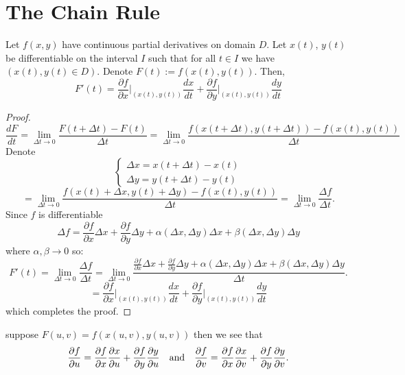 \documentclass[11pt,a4paper]{article}
\begin{document}
  \section{The Chain Rule}
  \begin{proposition}
    Let $f(x,y)$ have continuous partial derivatives on domain $D$.
    Let $x(t)$, $y(t)$ be differentiable on the interval $I$ such that
    for all $t \in I$ we have $(x(t),y(t) \in D)$.
    Denote $F(t) := f(x(t),y(t))$.
    Then,
    \[
      F'(t) = 
      \frac{\partial f}{\partial x}\biggr|_{(x(t),y(t))}\frac{dx}{dt} + 
      \frac{\partial f}{\partial y}\biggr|_{(x(t),y(t))}\frac{dy}{dt}
    \]
  \end{proposition}
  \begin{proof}
    \[
      \frac{dF}{dt} =
      \lim_{\Delta t\to 0}{\frac{F(t+\Delta t)-F(t)}{\Delta t}} =
      \lim_{\Delta t\to 0}
      {\frac{f(x(t+\Delta t),y(t+\Delta t))-f(x(t),y(t))}{\Delta t}} 
    \]
    Denote
    $$\begin{cases}
      \Delta x = x(t+\Delta t) - x(t) \\
      \Delta y = y(t+\Delta t) - y(t) 
    \end{cases}$$
    \[
      = \lim_{\Delta t\to 0}
      {\frac{f(x(t) + \Delta x,y(t)+\Delta y)-f(x(t),y(t))}{\Delta t}} 
      = \lim_{\Delta t\to 0}{\frac{\Delta f}{\Delta t}}.
    \]
    Since $f$ is differentiable
    \[
      \Delta f =
      \frac{\partial f}{\partial x}\Delta x + 
      \frac{\partial f}{\partial y}\Delta y + 
      \alpha(\Delta x,\Delta y)\Delta x + \beta(\Delta x,\Delta y)\Delta y
    \]
    where $\alpha,\beta\to 0 $ so:
    \[
      F'(t) =
      \lim_{\Delta t\to 0}{\frac{\Delta f}{\Delta t}} =
      \lim_{\Delta t\to 0}{\frac{\frac{\partial f}{\partial x}\Delta x + 
      \frac{\partial f}{\partial y}\Delta y +
      \alpha(\Delta x,\Delta y)\Delta x + 
      \beta(\Delta x,\Delta y)\Delta y}{\Delta t}}.
    \]
    \[
      = \frac{\partial f}{\partial x}\biggr|_{(x(t),y(t))}\frac{dx}{dt} + 
        \frac{\partial f}{\partial y}\biggr|_{(x(t),y(t))}\frac{dy}{dt}
    \]
    which completes the proof.
  \end{proof}

  \begin{corollary}
    suppose $F(u,v) = f(x(u,v),y(u,v))$ then we see that
    \[
      \frac{\partial f}{\partial u} =
      \frac{\partial f}{\partial x}
      \frac{\partial x}{\partial u} +
      \frac{\partial f}{\partial y}
      \frac{\partial y}{\partial u}
    \quad \text{and} \quad
      \frac{\partial f}{\partial v} =
      \frac{\partial f}{\partial x}
      \frac{\partial x}{\partial v} +
      \frac{\partial f}{\partial y}
      \frac{\partial y}{\partial v}.
    \]
  \end{corollary}
\end{document}

